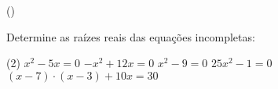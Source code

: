 \begin{question}[type=exam] () %

Determine as raízes reais das equações incompletas:

\begin{tasks}(2)
        \task $x^2-5x=0$
        \task $-x^2+12x=0$
        \task $x^2-9=0$
        \task $25x^2-1=0$
        \task $(x-7) \cdot (x-3)+10x=30$
    \end{tasks}
\end{question}

